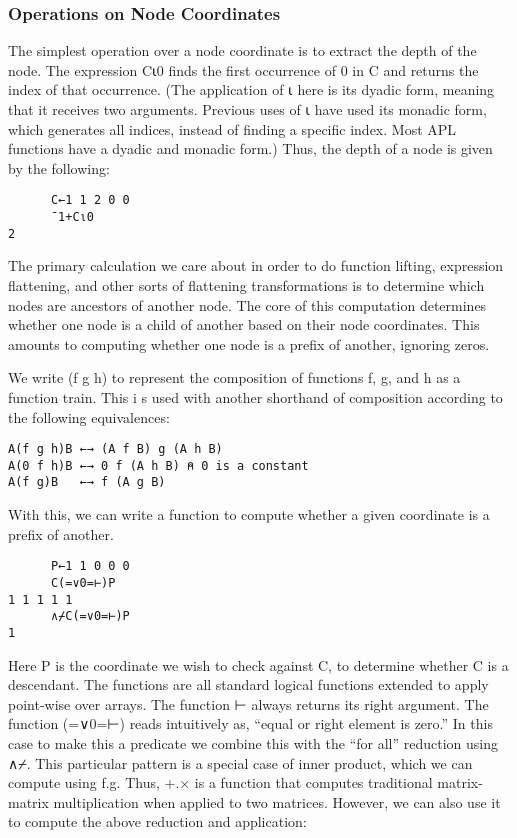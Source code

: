 \documentclass[numbers,preprint]{sigplanconf}
\begin{document}
\subsubsection{Operations on Node Coordinates}

The simplest operation over a node coordinate is to extract the depth
of the node. The expression C⍳0 finds the first occurrence of 0 in C
and returns the index of that occurrence. (The application of ⍳ here
is its dyadic form, meaning that it receives two arguments. Previous
uses of ⍳ have used its monadic form, which generates all indices,
instead of finding a specific index. Most APL functions have a
dyadic and monadic form.)  Thus, the depth of a node is given by
the following:

\begin{verbatim}
      C←1 1 2 0 0
      ¯1+C⍳0
2
\end{verbatim}

The primary calculation we care about in order to do function lifting,
expression flattening, and other sorts of flattening transformations
is to determine which nodes are ancestors of another node. The core
of this computation determines whether one node is a child of another
based on their node coordinates. This amounts to computing whether
one node is a prefix of another, ignoring zeros.

We write (f g h) to represent the composition of functions f, g,
and h as a function train. This i s used with another shorthand of
composition according to the following equivalences:

\begin{verbatim}
A(f g h)B ←→ (A f B) g (A h B)
A(0 f h)B ←→ 0 f (A h B) ⍝ 0 is a constant
A(f g)B   ←→ f (A g B)
\end{verbatim}

With this, we can write a function to compute whether a given
coordinate is a prefix of another.

\begin{verbatim}
      P←1 1 0 0 0
      C(=∨0=⊢)P
1 1 1 1 1
      ∧⌿C(=∨0=⊢)P
1
\end{verbatim}

Here P is the coordinate we wish to check against C, to determine
whether C is a descendant. The functions are all standard logical
functions extended to apply point-wise over arrays. The function
⊢ always returns its right argument. The function (=∨0=⊢)
reads intuitively as, “equal or right element is zero.” In this
case to make this a predicate we combine this with the “for all”
reduction using ∧⌿. This particular pattern is a special case
of inner product, which we can compute using f.g. Thus, +.× is a
function that computes traditional matrix-matrix multiplication when
applied to two matrices. However, we can also use it to compute the
above reduction and application:
 
\end{document}
